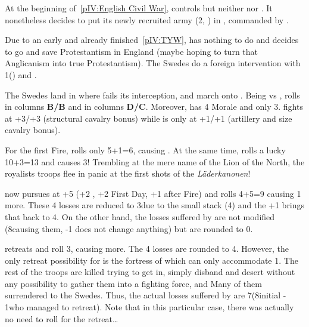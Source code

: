 \begin{exemple}
  At the beginning of~\ref{pIV:English Civil War},  controls
  \provinceCornwall but neither \provinceGloucester nor \provinceWessex. It
  nonetheless decides to put its newly recruited army (2\ARMY\faceplus,
  ) in \provinceCornwall, commanded by
  .

  Due to an early and already finished~\ref{pIV:TYW}, 
  has nothing to do and decides to go and save Protestantism in England (maybe
  hoping to turn that Anglicanism into true Protestantism). The Swedes do a
  foreign intervention with 1\ARMY\faceplus () and
  .

  The Swedes land in \provinceWessex where  fails its
  interception, and march onto \provinceCornwall. Being \TBAR vs \TMUS, \SUE
  rolls in columns \textbf{B/B} and  in columns
  \textbf{D/C}. Moreover, \SUE has 4 Morale and  only 3. \SUE
  fights at +3/+3 (structural cavalry bonus) while  is only
  at +1/+1 (artillery and size cavalry bonus).

  For the first Fire,  rolls only 5+1=6, causing \texttu. At
  the same time,  rolls a lucky 10+3=13 and causes
  3\textetoile\textetoile\textetoile! Trembling at the mere name of the Lion
  of the North, the royalists troops flee in panic at the first shots of the
  \emph{L\"{a}derkanonen}!

   now pursues at +5 (+2 \Shock, +2 First Day, +1 after
  Fire) and rolls 4+5=9 causing 1 more. These 4 losses are
  reduced to 3\texttu due to the small \SUE stack (4\LD) and the +1
   brings that back to 4. On the other hand, the
  \texttu losses suffered by \SUE are not modified (8\LD causing them, -1
   does not change anything) but are rounded to 0.

   retreats and roll 3, causing \texttu more. The 4\texttu
  losses are rounded to 4. However, the only retreat possibility for
   is the fortress of  which can only
  accommodate 1\LD. The rest of the troops are killed trying to get in, simply
  disband and desert without any possibility to gather them into a fighting
  force, and Many of them surrendered to the Swedes. Thus, the actual losses
  suffered by  are 7\LD (8\LD initial - 1\LD who managed to
  retreat). Note that in this particular case, there was actually no need to
  roll for the retreat\ldots
\end{exemple}

